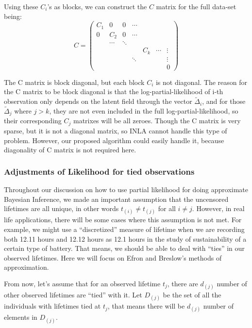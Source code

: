 \documentclass[]{article}
\begin{document}
Using these \(C_i\)'s as blocks, we can construct the \(C\) matrix for
the full data-set being: \begin{equation}
C = \begin{pmatrix} 
C_1 & 0 & 0 & \cdots & & \\ 
0 & C_2 & 0 & \cdots & & \\
  & \cdots & \ddots &  & & \\
& & & & C_k & \cdots & \vdots \\ 
& & & \ddots & &&\vdots \\
& & & & & & 0
\end{pmatrix}
\end{equation}

The C matrix is block diagonal, but each block \(C_i\) is not diagonal.
The reason for the C matrix to be block diagonal is that the
log-partial-likelihood of i-th observation only depends on the latent
field through the vector \(\tilde{\Delta}_i\), and for those
\(\tilde{\Delta}_j\) where \(j>k\), they are not even included in the
full log-partial-likelihood, so their corresponding \(C_j\) matrixes
will be all zeroes. Though the C matrix is very sparse, but it is not a
diagonal matrix, so INLA cannot handle this type of problem. However,
our proposed algorithm could easily handle it, because diagonality of C
matrix is not required here.

\hypertarget{adjustments-of-likelihood-for-tied-observations}{%
\subsubsection{Adjustments of Likelihood for tied
observations}\label{adjustments-of-likelihood-for-tied-observations}}

Throughout our discussion on how to use partial likelihood for doing
approximate Bayesian Inference, we made an important assumption that the
uncensored lifetimes are all unique, in other words
\(t_{(i)} \ne t_{(j)}\) for all \(i\neq j\). However, in real life
applications, there will be some cases where this assumption is not met.
For example, we might use a ``discretized'' measure of lifetime when we
are recording both 12.11 hours and 12.12 hours as 12.1 hours in the
study of sustainability of a certain type of battery. That means, we
should be able to deal with ``ties'' in our observed lifetimes. Here we
will focus on Efron and Breslow's methods of approximation.

From now, let's assume that for an observed lifetime \(t_j\), there are
\(d_{(j)}\) number of other observed lifetimes are ``tied'' with it. Let
\(D_{(j)}\) be the set of all the individuals with lifetimes tied at
\(t_j\), that means there will be \(d_{(j)}\) number of elements in
\(D_{(j)}\).
\end{document}
